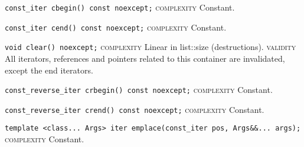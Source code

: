\noindent{}\hspace*{0.25em}\lstinline[basicstyle=\ttfamily\color{cgreen}]{const_iter cbegin() const noexcept;} \textsc{complexity} Constant.\\\vspace{-0.6em}

\noindent{}\hspace*{0.25em}\lstinline[basicstyle=\ttfamily\color{cgreen}]{const_iter cend() const noexcept;} \textsc{complexity} Constant.\\\vspace{-0.6em}

\noindent{}\hspace*{0.25em}\lstinline[basicstyle=\ttfamily\color{corange}]{void clear() noexcept;} \textsc{complexity} Linear in list::size (destructions). \textsc{validity} All iterators, references and pointers related to this container are invalidated, except the end iterators.\\\vspace{-0.6em}

\noindent{}\hspace*{0.25em}\lstinline[basicstyle=\ttfamily\color{cgreen}]{const_reverse_iter crbegin() const noexcept;} \textsc{complexity} Constant.\\\vspace{-0.6em}

\noindent{}\hspace*{0.25em}\lstinline[basicstyle=\ttfamily\color{cgreen}]{const_reverse_iter crend() const noexcept;} \textsc{complexity} Constant.\\\vspace{-0.6em}

\noindent{}\hspace*{0.25em}\lstinline[basicstyle=\ttfamily\color{cgreen}]{template <class... Args> iter emplace(const_iter pos, Args&&... args);} \textsc{complexity} Constant.\\\vspace{-0.6em}

